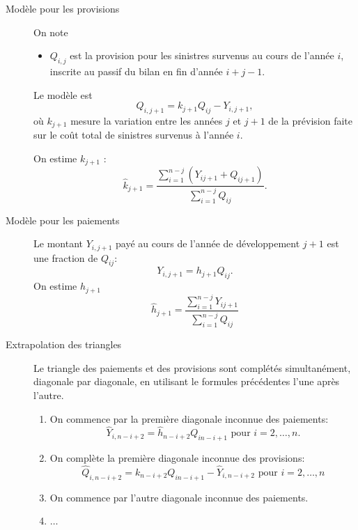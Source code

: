 \begin{description}
\item[Modèle pour les provisions] On note
  \begin{itemize}
  \item $Q_{i,j}$ est la provision pour les sinistres survenus au
    cours de l'année $i$, inscrite au passif du bilan en fin d'année
    $i+j-1$.
  \end{itemize}
  Le modèle est
  \begin{equation*}
    Q_{i, j+1} = k_{j+1} Q_{ij} - Y_{i, j+1},
  \end{equation*}
  où $k_{j+1}$ mesure la variation entre les années $j$ et $j+1$ de la
  prévision faite sur le coût total de sinistres survenus à l'année
  $i$.

  On estime $k_{j+1}$ :
  \begin{equation*}
    \hat{k}_{j+1} = \frac{\sum_{i=1}^{n-j} \left( Y_{i j+1} + Q_{i j+1} \right)}{\sum_{i=1}^{n-j} Q_{i j}}.
  \end{equation*}
\item[Modèle pour les paiements] Le montant $Y_{i, j+1}$ payé au cours
  de l'année de développement $j+1$ est une fraction de $ Q_{ij}$:
  \begin{equation*}
    Y_{i, j+1} = h_{j+1}  Q_{ij}.
  \end{equation*}
  On estime $h_{j+1}$
  \begin{equation*}
    \hat{h}_{j+1} = \frac{\sum_{i=1}^{n-j} Y_{i j+1}}{\sum_{i=1}^{n-j} Q_{i j}}
  \end{equation*}
\item[Extrapolation des triangles] Le triangle des paiements et des
  provisions sont complétés simultanément, diagonale par diagonale, en
  utilisant le formules précédentes l'une après l'autre.
  \begin{enumerate}
  \item On commence par la première diagonale inconnue des paiements:
    \begin{equation*}
      \hat{Y}_{i, n-i+2} = \hat{h}_{n-i+2}  Q_{i n-i+1} \text{ pour } i=2,\ldots,n.
    \end{equation*}
  \item On complète la première diagonale inconnue des provisions:
    \begin{equation*}
      \hat{Q}_{i, n-i+2} = k_{n-i+2} Q_{i n-i+1} - \hat{Y}_{i, n-i+2}
      \text{ pour } i=2, \ldots, n
    \end{equation*}
  \item On commence par l'autre diagonale inconnue des paiements.
  \item $\ldots$
  \end{enumerate}
\end{description}

